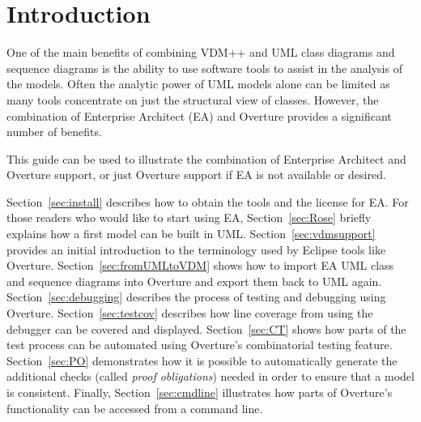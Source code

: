 


\section{Introduction}

One of the main benefits of combining VDM++ and UML class diagrams and
sequence diagrams is
the ability to use software tools to assist in the analysis of the
models. Often the analytic power of UML models alone can be limited as
many tools concentrate on just the structural view of
classes. However, the combination of Enterprise Architect (EA) and
Overture provides a significant number of benefits.

This guide can be used to illustrate the combination of Enterprise
Architect and
Overture support, or just Overture support if EA is
not available or desired.

Section~\ref{sec:install} describes how to obtain the tools and the
license for EA. For those readers who would like to start using
EA, Section~\ref{sec:Rose} briefly explains how a
first model can be built in UML.  Section~\ref{sec:vdmsupport}
provides an initial introduction to the terminology used by Eclipse
tools like Overture. Section~\ref{sec:fromUMLtoVDM} shows how to
import EA UML class and sequence diagrams into Overture and
export them back to UML again.  
Section~\ref{sec:debugging} describes the process of testing and
debugging using Overture. Section~\ref{sec:testcov}  describes how
line coverage from using the debugger can be covered and displayed. 
Section~\ref{sec:CT} shows how parts of the test process can be 
automated using Overture's combinatorial testing feature.  
Section~\ref{sec:PO} demonstrates how it is possible to automatically 
generate the additional checks (called \emph{proof obligations}) needed 
in order to ensure that a model is
consistent.  Finally, Section~\ref{sec:cmdline} illustrates how parts
of Overture's functionality can be accessed from a command line.




